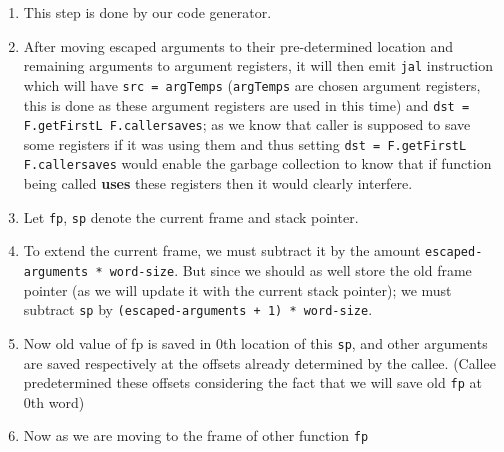 \begin{enumerate}
  \begin{enumerate}
  \def\labelenumii{\arabic{enumii}.}
  \item
    This step is done by our code generator.
  \item
    After moving escaped arguments to their pre-determined location and
    remaining arguments to argument registers, it will then emit
    \texttt{jal}
    instruction which will have
    \texttt{src = argTemps}
    (\texttt{argTemps}
    are chosen argument registers, this is done as these argument
    registers are used in this time) and
    \texttt{dst = F.getFirstL F.callersaves};
    as we know that caller is supposed to save some registers if it was
    using them and thus setting
    \texttt{dst = F.getFirstL F.callersaves}
    would enable the garbage collection to know that if function being
    called \textbf{uses} these registers then it would clearly
    interfere.
  \item
    Let
    \texttt{fp},
    \texttt{sp}
    denote the current frame and stack pointer.
  \item
    To extend the current frame, we must subtract it by the amount
    \texttt{escaped-arguments * word-size}.
    But since we should as well store the old frame pointer (as we will
    update it with the current stack pointer); we must subtract
    \texttt{sp}
    by
    \texttt{(escaped-arguments + 1) * word-size}.
  \item
    Now old value of fp is saved in 0th location of this
    \texttt{sp},
    and other arguments are saved respectively at the offsets already
    determined by the callee. (Callee predetermined these offsets
    considering the fact that we will save old
    \texttt{fp}
    at 0th word)
  \item
    Now as we are moving to the frame of other function
    \texttt{fp}

\end{enumerate}
\end{enumerate}
